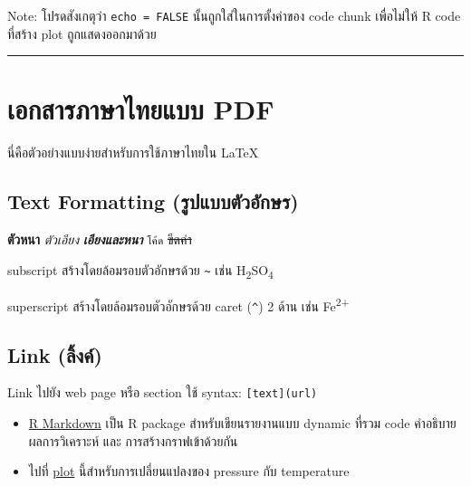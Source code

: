 \documentclass[
  letterpaper,
  DIV=11,
  numbers=noendperiod]{scrartcl}
\begin{document}
Note: โปรดสังเกตุว่า \texttt{echo\ =\ FALSE} นั้นถูกใส่ในการตั้งค่าของ
code chunk เพื่อไม่ให้ R code ที่สร้าง plot ถูกแสดงออกมาด้วย

\begin{center}\rule{0.5\linewidth}{0.5pt}\end{center}

\hypertarget{uxe40uxe2duxe01uxe2auxe32uxe23uxe20uxe32uxe29uxe32uxe44uxe17uxe22uxe41uxe1auxe1a-pdf}{%
\section{เอกสารภาษาไทยแบบ
PDF}\label{uxe40uxe2duxe01uxe2auxe32uxe23uxe20uxe32uxe29uxe32uxe44uxe17uxe22uxe41uxe1auxe1a-pdf}}

นี่คือตัวอย่างแบบง่ายสำหรับการใช้ภาษาไทยใน \LaTeX

\hypertarget{text-formatting-uxe23uxe1buxe41uxe1auxe1auxe15uxe27uxe2duxe01uxe29uxe23}{%
\subsection{Text Formatting
(รูปแบบตัวอักษร)}\label{text-formatting-uxe23uxe1buxe41uxe1auxe1auxe15uxe27uxe2duxe01uxe29uxe23}}

\textbf{ตัวหนา} \emph{ตัวเอียง} \textbf{\emph{เอียงและหนา}}
\texttt{โค้ด} \sout{ขีดค่า}

subscript สร้างโดยล้อมรอบตัวอักษรด้วย \texttt{\textasciitilde{}} เช่น
H\textsubscript{2}SO\textsubscript{4}

superscript สร้างโดยล้อมรอบตัวอักษรด้วย caret (\texttt{\^{}}) 2 ด้าน
เช่น Fe\textsuperscript{2+}

\hypertarget{link-uxe25uxe07uxe04}{%
\subsection{Link (ลิ้งค์)}\label{link-uxe25uxe07uxe04}}

Link ไปยัง web page หรือ section ใช้ syntax: \texttt{{[}text{]}(url)}

\begin{itemize}
\item
  \href{https://rmarkdown.rstudio.com}{R Markdown} เป็น R package
  สำหรับเขียนรายงานแบบ dynamic ที่รวม code คำอธิบาย ผลการวิเคราะห์ และ
  การสร้างกราฟเข้าด้วยกัน
\item
  ไปที่ \protect\hyperlink{plot}{plot} นี้สำหรับการเปลี่ยนแปลงของ
  pressure กับ temperature
\end{itemize}
\end{document}

